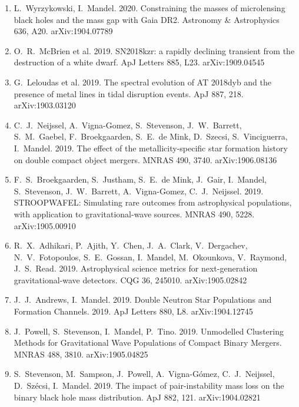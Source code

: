 \documentclass[margin,line]{res}
\begin{document}
\begin{resume}
\begin{enumerate}
\item L.~Wyrzykowski, I.~Mandel.  2020.  Constraining the masses of microlensing black holes and the mass gap with Gaia DR2.  Astronomy \& Astrophysics 636, A20.  arXiv:1904.07789

\item O.~R.~McBrien et al. 2019. SN2018kzr: a rapidly declining transient from the destruction of a white dwarf. ApJ Letters 885, L23.  arXiv:1909.04545

\item G.~Leloudas et al.  2019. The spectral evolution of AT 2018dyb and the presence of metal lines in tidal disruption events.  ApJ 887, 218.  arXiv:1903.03120

\item C.~J.~Neijssel, A.~Vigna-Gomez, S.~Stevenson, J.~W.~Barrett, S.~M.~Gaebel, F.~Broekgaarden, S.~E.~de Mink, D.~Szecsi, S.~Vinciguerra, I.~Mandel.  2019. The effect of the metallicity-specific star formation history on double compact object mergers.  MNRAS 490, 3740.  arXiv:1906.08136

\item F.~S.~Broekgaarden, S.~Justham, S.~E.~de Mink, J.~Gair, I.~Mandel, S.~Stevenson, J.~W.~Barrett, A.~Vigna-Gomez, C.~J.~Neijssel.  2019. STROOPWAFEL: Simulating rare outcomes from astrophysical populations, with application to gravitational-wave sources.  MNRAS 490, 5228.  arXiv:1905.00910

\item R.~X.~Adhikari, P.~Ajith, Y.~Chen, J.~A.~Clark, V.~Dergachev, N.~V.~Fotopoulos, S.~E.~Gossan, I.~Mandel, M.~Okounkova, V.~Raymond, J.~S.~Read.  2019. Astrophysical science metrics for next-generation gravitational-wave detectors.  CQG 36, 245010.  arXiv:1905.02842

\item J.~J.~Andrews, I.~Mandel. 2019. Double Neutron Star Populations and Formation Channels.   2019.  ApJ Letters 880, L8.  arXiv:1904.12745

\item J.~Powell, S.~Stevenson, I.~Mandel, P.~Tino.  2019.  Unmodelled Clustering Methods for Gravitational Wave Populations of Compact Binary Mergers.  MNRAS 488, 3810. arXiv:1905.04825

\item S.~Stevenson, M.~Sampson, J.~Powell, A.~Vigna-G\'{o}mez, C.~J.~Neijssel, D.~Sz\'{e}csi, I.~Mandel.  2019. The impact of pair-instability mass loss on the binary black hole mass distribution.   ApJ 882, 121.  arXiv:1904.02821 


\end{enumerate}
\end{resume}
\end{document}
